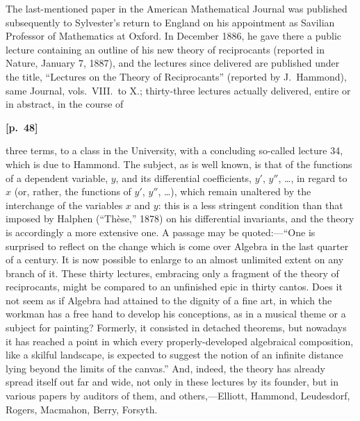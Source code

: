 \documentclass[11pt,a4paper]{book}
\begin{document}
The last-mentioned paper in the American Mathematical Journal was published subsequently to Sylvester's return to England on his appointment as Savilian Professor of Mathematics at Oxford. In December 1886, he gave there a public lecture containing an outline of his new theory of reciprocants (reported in Nature, January 7, 1887), and the lectures since delivered are published under the title, ``Lectures on the Theory of Reciprocants'' (reported by J.\ Hammond), same Journal, vols.\ VIII.\ to X.; thirty-three lectures actually delivered, entire or in abstract, in the course of

\vspace{0.5em}
\noindent\textbf{[p.\ 48]}

three terms, to a class in the University, with a concluding so-called lecture 34, which is due to Hammond. The subject, as is well known, is that of the functions of a dependent variable, $y$, and its differential coefficients, $y'$, $y''$, \ldots, in regard to $x$ (or, rather, the functions of $y'$, $y''$, \ldots), which remain unaltered by the interchange of the variables $x$ and $y$: this is a less stringent condition than that imposed by Halphen (``Th\`ese,'' 1878) on his differential invariants, and the theory is accordingly a more extensive one. A passage may be quoted:---``One is surprised to reflect on the change which is come over Algebra in the last quarter of a century. It is now possible to enlarge to an almost unlimited extent on any branch of it. These thirty lectures, embracing only a fragment of the theory of reciprocants, might be compared to an unfinished epic in thirty cantos. Does it not seem as if Algebra had attained to the dignity of a fine art, in which the workman has a free hand to develop his conceptions, as in a musical theme or a subject for painting? Formerly, it consisted in detached theorems, but nowadays it has reached a point in which every properly-developed algebraical composition, like a skilful landscape, is expected to suggest the notion of an infinite distance lying beyond the limits of the canvas.'' And, indeed, the theory has already spread itself out far and wide, not only in these lectures by its founder, but in various papers by auditors of them, and others,---Elliott, Hammond, Leudesdorf, Rogers, Macmahon, Berry, Forsyth.
\end{document}
